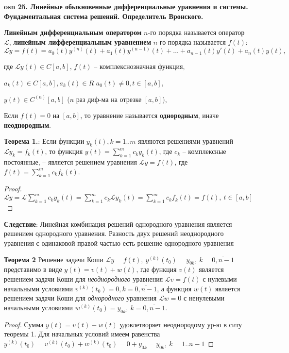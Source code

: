 \textbf{\LARGE osn 25. Линейные обыкновенные дифференциальные уравнения и системы. Фундаментальная система решений. Определитель Вронского.}



\textbf{Линейным дифференциальным оператором} $n$-го порядка называется оператор $\mathcal{L}$, \textbf{линейным лифференциальным уравнением}  $n$-го порядка называется $f(t)$:
$$\mathcal{L} y = f(t) = a_0(t)y^{(n)}(t) + a_1(t)y^{(n-1)}(t) +\dots + a_{n-1}(t)y'(t) + a_n(t)y(t),$$

где $\mathcal{L}y(t) \in C[a, b]$, $f(t)$ -- комплекснозначная функция, 

$a_k(t) \in C[a,b], a_k(t) \in R$ $a_0(t) \neq 0, t \in [a,b]$,

$y(t) \in C^{(n)}[a,b]$ ($n$ раз диф-ма на отрезке $[a,b]$), 


Если $f(t) = 0$ на $[a, b]$, то уравнение называется \textbf{однородным}, иначе \textbf{неоднородным}.

\textbf{Теорема 1.}:
Если функции $y_k(t), k=1..m$ являются решениями уравнений $\mathcal{L} y_k = f_k(t)$, то функция $y(t) = \sum_{k=1}^m c_k y_k(t)$, где $c_k$ -- комплексные постоянные, -- является решением уравнения  $\mathcal{L} y = f(t)$, где $f(t) =  \sum_{k=1}^m c_k f_k(t)$.

\begin{proof}
$\mathcal{L} y = \mathcal{L} \sum_{k=1}^m c_k y_k(t) = \sum_{k=1}^m c_k \mathcal{L} y_k(t) = \sum_{k=1}^m c_k f_k(t) = f(t), \ t \in [a,b]$
\end{proof}

\textbf{Следствие}: Линейная комбинация решений однородного уравнения является решением однородного уравнения. Разность двух решений неоднородного уравнения с одинаковой правой частью есть решение однородного уравнения

\textbf{Теорема 2} Решение задачи Коши $\mathcal{L}y = f(t),~y^{(k)}(t_0) = y_{0k},~k = \overline{0, n - 1}$ представимо в виде $y(t) = v(t) + w(t)$, где функция $v(t)$ является решением задачи Коши для \textit{неоднородного} уравнения $\mathcal{L}v = f(t)$ с нулевыми начальными условиями $v^{(k)}(t_0) = 0, k = \overline{0, n - 1}$, а функция $w(t)$ является решением задачи Коши для \textit{однородного} уравнения $\mathcal{L}w = 0$ с ненулевыми начальными условиями $w^{(k)}(t_0) = y_{0k},~k = \overline{0, n - 1}$.

\begin{proof}
Сумма $y(t) = v(t) + w(t)$ удовлетворяет неоднородому ур-ю в ситу теоремы 1. Для начальных условий имеем равенства $y^{(k)}(t_0) = v^{(k)}(t_0) + w^{(k)}(t_0) = 0 + y_{0k} = y_{0k}, \ k=1..n-1$
\end{proof}

